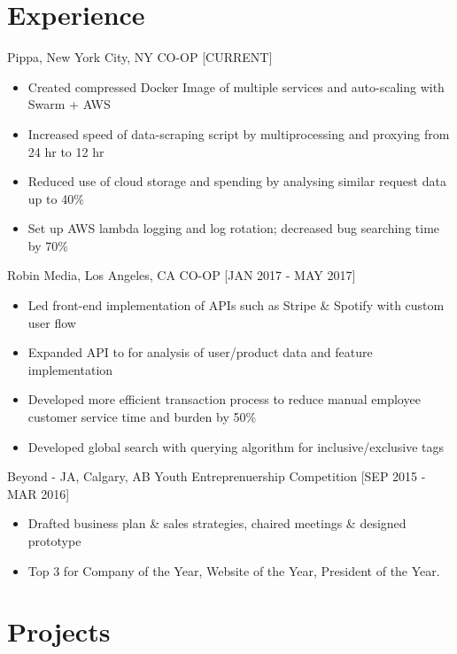 \documentclass[]{friggeri-cv}
\begin{document}
\section{Experience}

\begin{entrylist}
	\entry
	{Pippa, New York City, NY}
	{CO-OP [CURRENT]}
	{
		\begin{itemize}[topsep=0pt,leftmargin=*]
			\item Created compressed Docker Image of multiple services and auto-scaling with Swarm + AWS
			\item Increased speed of data-scraping script by multiprocessing and proxying from 24 hr to 12 hr
			\item Reduced use of cloud storage and spending by analysing similar request data up to 40\%
			\item Set up AWS lambda logging and log rotation; decreased bug searching time by 70\%   
		\end{itemize}
	}
	\entry
	{Robin Media, Los Angeles, CA}
	{CO-OP [JAN 2017 - MAY 2017]}
	{
		\begin{itemize}[topsep=0pt,leftmargin=*]
			\item Led front-end implementation of APIs such as Stripe \& Spotify with custom user flow
			\item Expanded API to for analysis of user/product data and feature implementation
			\item Developed more efficient transaction process to reduce manual employee customer service time and burden by 50\%
			\item Developed global search with querying algorithm for inclusive/exclusive tags
		\end{itemize}
	}
	\entry
	{Beyond - JA, Calgary, AB}
	{Youth Entreprenuership Competition [SEP 2015 - MAR 2016]}
	{
		\begin{itemize}[topsep=0pt,leftmargin=*]
			\item Drafted business plan \& sales strategies, chaired meetings \& designed prototype
			\item Top 3 for Company of the Year, Website of the Year, President of the Year.
	\end{itemize}}
\end{entrylist}

\section{Projects}
\end{document}
